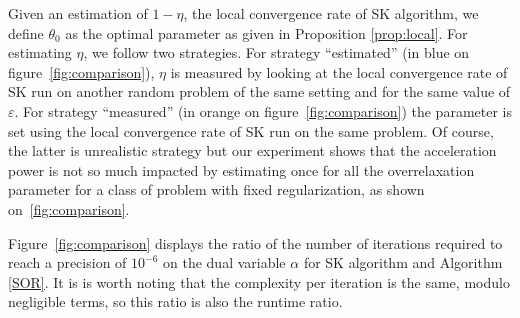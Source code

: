 \documentclass{article} %
\DeclareMathOperator{\IR}{\mathbb{R}}
\DeclareMathOperator{\Ccal}{\mathcal{C}}
\DeclareMathOperator{\diag}{diag}
\renewcommand{\epsilon}{\varepsilon}
\theoremstyle{plain}
\theoremstyle{definition}
\theoremstyle{remark}
\begin{document}
Given an estimation of $1-\eta$, the local convergence rate of SK algorithm, we define $\theta_0$ as the optimal parameter as given in Proposition \ref{prop:local}.
For estimating $\eta$, we follow two strategies. For strategy ``estimated'' (in blue on figure~\ref{fig:comparison}), $\eta$ is measured by looking at the local convergence rate of SK run on another random problem of the same setting and for the same value of $\epsilon$.
For strategy ``measured'' (in orange on figure~\ref{fig:comparison}) the parameter is set using the local convergence rate of SK run on the same problem.
Of course, the latter is unrealistic strategy but our experiment shows that the acceleration power is not so much impacted by estimating once for all the overrelaxation parameter for a class of problem with fixed regularization, as shown on~\ref{fig:comparison}.

Figure~\ref{fig:comparison} displays the ratio of the number of iterations required to reach a precision of $10^{-6}$ on the dual variable $\alpha$ for SK algorithm and Algorithm \ref{SOR}.
It is is worth noting that the complexity per iteration is the same, modulo negligible terms, so this ratio is also the runtime ratio.


\renewcommand{\algorithmiccomment}[1]{\hfill\bgroup(#1)\egroup}
\end{document}
